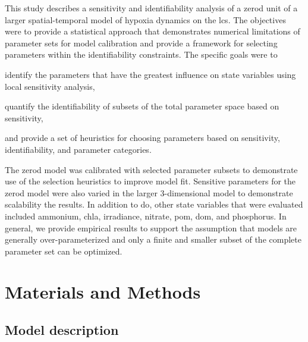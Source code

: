 \documentclass[review]{elsarticle}\usepackage[]{graphicx}\usepackage[]{color}
\begin{document}
This study describes a sensitivity and identifiability analysis of a \ac{zerod} unit of a larger spatial-temporal model of hypoxia dynamics on the \ac{lcs}.  The objectives were to provide a statistical approach that demonstrates numerical limitations of parameter sets for model calibration and provide a framework for selecting parameters within the identifiability constraints.  The specific goals were to \begin{inparaenum}[1\upshape)]
\item identify the parameters that have the greatest influence on state variables using local sensitivity analysis,
\item quantify the identifiability of subsets of the total parameter space based on sensitivity,
\item and provide a set of heuristics for choosing parameters based on sensitivity, identifiability, and parameter categories.
\end{inparaenum}
The \ac{zerod} model was calibrated with selected parameter subsets to demonstrate use of the selection heuristics to improve model fit.  Sensitive parameters for the \ac{zerod} model were also varied in the larger 3-dimensional model to demonstrate scalability the results. In addition to \ac{do}, other state variables that were evaluated included ammonium, \ac{chla}, irradiance, nitrate, \ac{pom}, \ac{dom}, and phosphorus. In general, we provide empirical results to support the assumption that models are generally over-parameterized and only a finite and smaller subset of the complete parameter set can be optimized.

\section{Materials and Methods}

\subsection{Model description}
\end{document}
